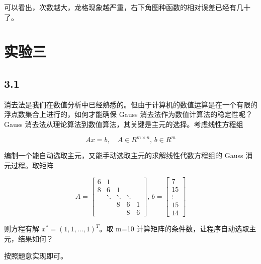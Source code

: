 可以看出，次数越大，龙格现象越严重，右下角图种函数的相对误差已经有几十了。





\section{实验三}
\subsection*{3.1}
消去法是我们在数值分析中已经熟悉的。但由于计算机的数值运算是在一个有限的浮点数集合上进行的，如何才能确保 Gauss 消去法作为数值计算法的稳定性呢？Gauss 消去法从理论算法到数值算法，其关键是主元的选择。考虑线性方程组

\[ Ax = b, \quad A \in R^{m \times n}, \, b \in R^m \]

编制一个能自动选取主元，又能手动选取主元的求解线性代数方程组的 Gauss 消元过程。取矩阵

\[ A = \begin{bmatrix} 6 & 1 \\ 8 & 6 & 1 \\ & \ddots & \ddots & \ddots \\ & & 8 & 6 & 1 \\ & & &8  & 6 \end{bmatrix}, \, b = \begin{bmatrix} 7 \\ 15 \\ \vdots \\ 15 \\ 14 \end{bmatrix} \]

则方程有解 \( x^* = (1, 1, \ldots, 1)^T \)。取 m=10 计算矩阵的条件数，让程序自动选取主元，结果如何？

按照题意实现即可。

